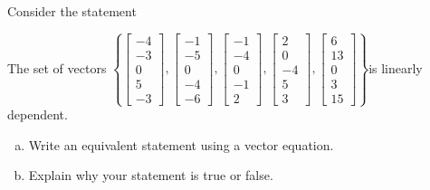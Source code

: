 
\begin{exerciseStatement}


Consider the statement 
\begin{center}\begin{minipage}{0.8\textwidth}
 The set of vectors \( \left\{ \left[\begin{array}{c}
-4 \\
-3 \\
0 \\
5 \\
-3
\end{array}\right] , \left[\begin{array}{c}
-1 \\
-5 \\
0 \\
-4 \\
-6
\end{array}\right] , \left[\begin{array}{c}
-1 \\
-4 \\
0 \\
-1 \\
2
\end{array}\right] , \left[\begin{array}{c}
2 \\
0 \\
-4 \\
5 \\
3
\end{array}\right] , \left[\begin{array}{c}
6 \\
13 \\
0 \\
3 \\
15
\end{array}\right] \right\} \)is linearly dependent.
\end{minipage}\end{center}
    


\begin{enumerate}[(a)]
\item  Write an equivalent statement using a vector equation.
\item  Explain why your statement is true or false.
\end{enumerate}
    
\end{exerciseStatement}
    
